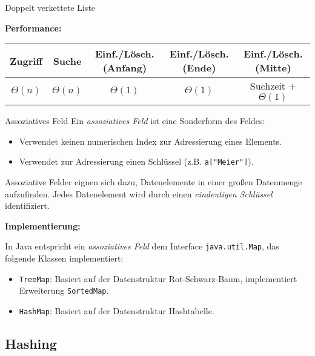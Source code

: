 \begin{defi}{Doppelt verkettete Liste}
\begin{center}
    \end{center}

    \textbf{Performance:}

    \begin{center}
        \begin{tabular}{c|c|c|c|c}
            Zugriff     & Suche       & Einf./Lösch. (Anfang) & Einf./Lösch. (Ende) & Einf./Lösch. (Mitte)   \\
            \hline
            $\Theta(n)$ & $\Theta(n)$ & $\Theta(1)$           & $\Theta(1)$         & Suchzeit + $\Theta(1)$ \\
        \end{tabular}
    \end{center}
\end{defi}

\begin{defi}{Assoziatives Feld}
    Ein \emph{assoziatives Feld} ist eine Sonderform des Feldes:
    \begin{itemize}
        \item Verwendet keinen numerischen Index zur Adressierung eines Elements.
        \item Verwendet zur Adressierung einen Schlüssel (z.B. \texttt{a["Meier"]}).
    \end{itemize}

    Assoziative Felder eignen sich dazu, Datenelemente in einer großen Datenmenge aufzufinden.
    Jedes Datenelement wird durch einen \emph{eindeutigen Schlüssel} identifiziert.

    \textbf{Implementierung:}

    In Java entspricht ein \emph{assoziatives Feld} dem Interface \texttt{java.util.Map}, das folgende Klassen implementiert:
    \begin{itemize}
        \item \texttt{TreeMap}: Basiert auf der Datenstruktur Rot-Schwarz-Baum, implementiert Erweiterung \texttt{SortedMap}.
        \item \texttt{HashMap}: Basiert auf der Datenstruktur Hashtabelle.
    \end{itemize}
\end{defi}


\subsection{Hashing}


